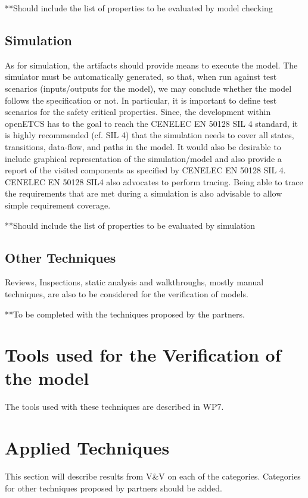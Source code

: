 \documentclass{template/openetcs_article}
\begin{document}
**Should include the list of properties to be evaluated by model checking

\subsection{Simulation}

As for simulation, the artifacts should provide means to execute the model. The simulator must be
automatically generated, so that, when run against test scenarios (inputs/outputs for the model),
we may conclude whether the model follows the specification or not. In particular, it is important
to define test scenarios for the safety critical properties. Since, the development within openETCS
has to the goal to reach the CENELEC EN 50128 SIL 4 standard, it is highly recommended (cf.
SIL 4) that the simulation needs to cover all states, transitions, data-flow, and paths in the model.
It would also be desirable to include graphical representation of the simulation/model and also
provide a report of the visited components as specified by CENELEC EN 50128 SIL 4.
CENELEC EN 50128 SIL4 also advocates to perform tracing. Being able to trace the requirements
that are met during a simulation is also advisable to allow simple requirement coverage.

**Should include the list of properties to be evaluated by simulation

\subsection{Other Techniques}

Reviews, Inspections, static analysis and walkthroughs, mostly manual techniques, are also to be
considered for the verification of models.

**To be completed with the techniques proposed by the partners. 

\section{Tools used for the Verification of the model}

The tools used with these techniques are described in WP7.

\section{Applied Techniques}

This section will describe results from V\&V on each of the categories. Categories for other techniques proposed by partners should be added.
\end{document}
